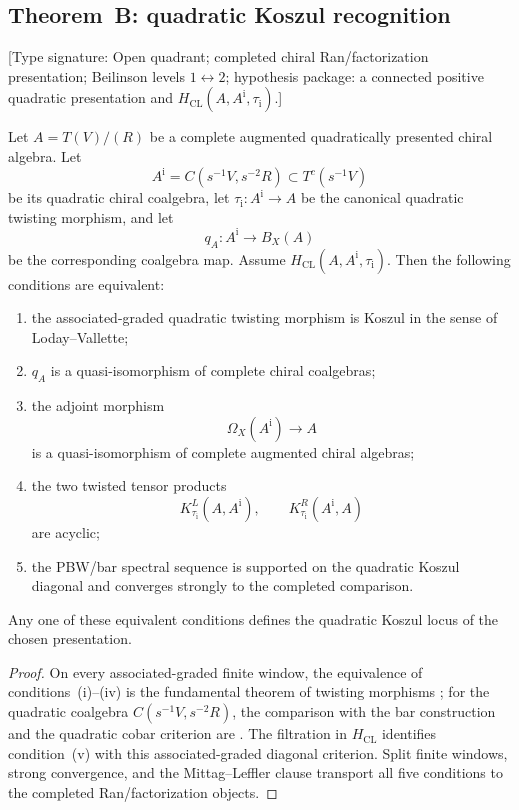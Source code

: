 \subsection{Theorem~B: quadratic Koszul recognition}

\begin{theorem}
\label{thm:bar-cobar-inversion-qi}
\textup{[Type signature: Open quadrant; completed chiral
Ran/factorization presentation; Beilinson levels
\(1\leftrightarrow2\); hypothesis package: a connected positive
quadratic presentation and
\(H_{\mathrm{CL}}(A,A^{\mathrm i},\tau_{\mathrm i})\).]}

Let \(A=T(V)/(R)\) be a complete augmented quadratically presented
chiral algebra.  Let
\[
A^{\mathrm i}=C(s^{-1}V,s^{-2}R)\subset T^c(s^{-1}V)
\]
be its quadratic chiral coalgebra, let
\(\tau_{\mathrm i}\colon A^{\mathrm i}\to A\) be the canonical
quadratic twisting morphism, and let
\[
q_A\colon A^{\mathrm i}\longrightarrow B_X(A)
\]
be the corresponding coalgebra map.  Assume
\(H_{\mathrm{CL}}(A,A^{\mathrm i},\tau_{\mathrm i})\).
Then the following conditions are equivalent:
\begin{enumerate}[label=\textup{(\roman*)}]
\item the associated-graded quadratic twisting morphism is Koszul in
the sense of Loday--Vallette;
\item \(q_A\) is a quasi-isomorphism of complete chiral coalgebras;
\item the adjoint morphism
\[
\Omega_X(A^{\mathrm i})\longrightarrow A
\]
is a quasi-isomorphism of complete augmented chiral algebras;
\item the two twisted tensor products
\[
K^L_{\tau_{\mathrm i}}(A,A^{\mathrm i}),
\qquad
K^R_{\tau_{\mathrm i}}(A^{\mathrm i},A)
\]
are acyclic;
\item the PBW/bar spectral sequence is supported on the quadratic
Koszul diagonal and converges strongly to the completed comparison.
\end{enumerate}
Any one of these equivalent conditions defines the quadratic Koszul
locus of the chosen presentation.
\end{theorem}

\begin{proof}
On every associated-graded finite window, the equivalence of
conditions~\textup{(i)}--\textup{(iv)} is the fundamental theorem of
twisting morphisms
\cite[Theorem~2.3.2]{LV12}; for the quadratic coalgebra
\(C(s^{-1}V,s^{-2}R)\), the comparison with the bar construction and the
quadratic cobar criterion are
\cite[Theorem~3.4.6]{LV12}.  The filtration in
\(H_{\mathrm{CL}}\) identifies condition~\textup{(v)} with this
associated-graded diagonal criterion.  Split finite windows, strong
convergence, and the Mittag--Leffler clause transport all five
conditions to the completed Ran/factorization objects.
\end{proof}

